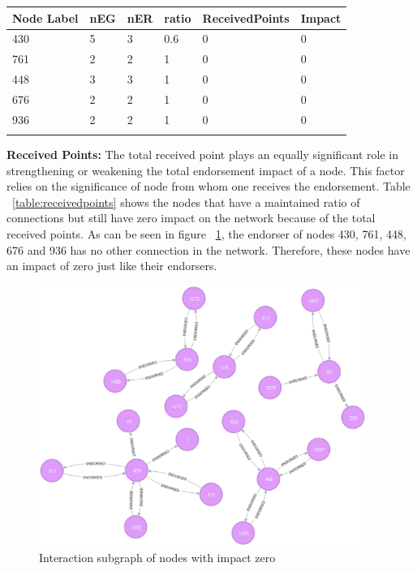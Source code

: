 \begin{tabularx}{\textwidth}{| X | X | X | X | X| X| }
  \hline
   \textbf{Node Label} & \textbf{nEG} & \textbf{nER} & \textbf{ratio} & \textbf{ReceivedPoints} & \textbf{Impact} \\
  \hline 
  430  & 5  & 3  & 0.6 & 0 & 0 \\
  \hline
   761 & 2  & 2  & 1 & 0 & 0 \\
  \hline
  448  & 3  & 3  & 1 & 0 & 0 \\
  \hline
  676  & 2  & 2  & 1 & 0 & 0 \\
  \hline
  936  & 2  & 2  & 1 & 0 & 0 \\
  \hline
  \caption{Nodes with Impact zero because of the receivedpoints}
  \label{table:receivedpoints}
\end{tabularx}

\textbf{Received Points:} The total received point plays an equally significant
role in strengthening or weakening the total endorsement impact of a node. This
factor relies on the significance of node from whom one receives the
endorsement. Table ~\ref{table:receivedpoints} shows the nodes that have a
maintained ratio of connections but still have zero impact on the network
because of the total received points. As can be seen in figure
~\ref{fig:zeroimpact}, the endorser of nodes 430, 761, 448, 676 and 936 has no
other connection in the network. Therefore, these nodes have an impact of zero
just like their endorsers. 

\begin{figure}[h]
	\includegraphics[width=0.95\textwidth]{Images/nodesWithImpactZero.eps}
	\caption{Interaction subgraph of nodes with impact zero}
	\label{fig:zeroimpact}
\end{figure}





